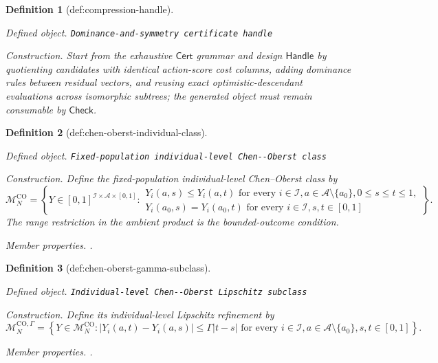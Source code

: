 \documentclass{article}
\newtheorem{definition}{Definition}
\begin{document}
\begin{definition}[def:compression-handle]\label{def:compression-handle}
\par\smallskip\noindent\emph{Defined object.} \texttt{Dominance-\allowbreak{}and-\allowbreak{}symmetry certificate handle}
\par\smallskip\noindent\emph{Construction.} Start from the exhaustive \(\mathsf{Cert}\) grammar and design \(\mathsf{Handle}\) by quotienting candidates with identical action-score cost columns, adding dominance rules between residual vectors, and reusing exact optimistic-descendant evaluations across isomorphic subtrees; the generated object must remain consumable by \(\mathsf{Check}\).
\end{definition}

\begin{definition}[def:chen-oberst-individual-class]\label{def:chen-oberst-individual-class}
\par\smallskip\noindent\emph{Defined object.} \texttt{Fixed-\allowbreak{}population individual-\allowbreak{}level Chen-\allowbreak{}-\allowbreak{}Oberst class}
\par\smallskip\noindent\emph{Construction.} Define the fixed-population individual-level Chen--Oberst class by
\[
\mathcal M_N^{\mathrm{CO}}
=\left\{Y\in[0,1]^{\mathcal I\times\mathcal A\times[0,1]}:
\begin{array}{l}
Y_i(a,s)\leq Y_i(a,t)\text{ for every }i\in\mathcal I,
a\in\mathcal A\setminus\{a_0\},0\leq s\leq t\leq1,\\
Y_i(a_0,s)=Y_i(a_0,t)\text{ for every }i\in\mathcal I,
s,t\in[0,1]
\end{array}\right\}.
\]
The range restriction in the ambient product is the bounded-outcome condition.
\par\smallskip\noindent\emph{Member properties.} .
\end{definition}

\begin{definition}[def:chen-oberst-gamma-subclass]\label{def:chen-oberst-gamma-subclass}
\par\smallskip\noindent\emph{Defined object.} \texttt{Individual-\allowbreak{}level Chen-\allowbreak{}-\allowbreak{}Oberst Lipschitz subclass}
\par\smallskip\noindent\emph{Construction.} Define its individual-level Lipschitz refinement by
\[
\mathcal M_N^{\mathrm{CO},\Gamma}
=\left\{Y\in\mathcal M_N^{\mathrm{CO}}:
|Y_i(a,t)-Y_i(a,s)|\leq\Gamma|t-s|
\text{ for every }i\in\mathcal I,
a\in\mathcal A\setminus\{a_0\},s,t\in[0,1]\right\}.
\]
\par\smallskip\noindent\emph{Member properties.} .
\end{definition}
\end{document}
